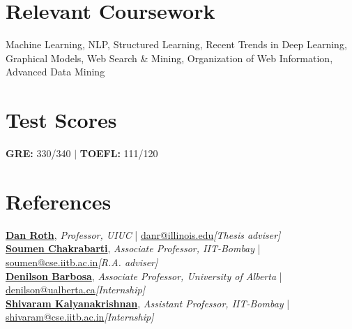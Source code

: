 \documentclass[margin,line]{templates/resume}
\newcommand{\myhref}[3][blue]{\href{#2}{\color{#1}{#3}}}
\newcommand{\compresslist}{%
\setlength{\itemsep}{3pt}%
\setlength{\parskip}{0pt}%
\setlength{\parsep}{0pt}%
}
\begin{document}
\begin{resume}
\section{\mysidestyle Relevant Coursework} 
Machine Learning, NLP, Structured Learning, Recent Trends in Deep Learning, Graphical Models, Web Search \& Mining, Organization of Web Information, Advanced Data Mining

\vspace{-0.2cm}    
\section{\mysidestyle Test Scores}
\textbf{GRE:} 330/340  $|$  \textbf{TOEFL:} 111/120



\vspace{-0.2cm}    
\section{\mysidestyle References} 
\textbf{\textsf{\href{http://www.cis.upenn.edu/~danroth/}{Dan Roth}}}, \textit{Professor, UIUC} | \href{mailto:danr@illinois.edu}{danr@illinois.edu}\hfill{\textit{[Thesis adviser]}}
\vspace{0.8mm}
\\
\textbf{\textsf{\href{https://www.cse.iitb.ac.in/~soumen/}{Soumen Chakrabarti}}}, \textit{Associate Professor, IIT-Bombay} | \href{mailto:soumen@cse.iitb.ac.in}{soumen@cse.iitb.ac.in}\hfill{\textit{[R.A. adviser]}}
\vspace{0.8mm}
\\
\textbf{\textsf{\href{https://sites.ualberta.ca/~denilson/}{Denilson Barbosa}}}, \textit{Associate Professor, University of Alberta} | \href{mailto:denilson@ualberta.ca}{denilson@ualberta.ca}\hfill{\textit{[Internship]}}
\vspace{0.8mm}
\\
\textbf{\textsf{\href{https://www.cse.iitb.ac.in/~shivaram/}{Shivaram Kalyanakrishnan}}}, \textit{Assistant Professor, IIT-Bombay} | \href{mailto:shivaram@cse.iitb.ac.in}{shivaram@cse.iitb.ac.in}\hfill{\textit{[Internship]}}


\end{resume}
\end{document}
